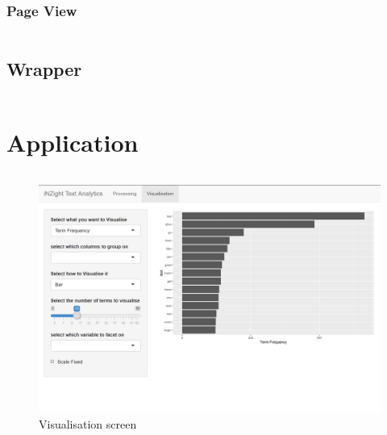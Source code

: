 \documentclass[11pt, a4paper, oneside]{report}
\begin{document}
\inputminted[frame=lines,fontsize=\scriptsize,xleftmargin=\parindent,linenos]{R}{R/time-series.R}

\subsubsection{Page View}\label{sec:page-view}

\inputminted[frame=lines,fontsize=\scriptsize,xleftmargin=\parindent,linenos]{R}{R/page-view.R}

\subsection{Wrapper}\label{sec:wrapper-1}

\inputminted[frame=lines,fontsize=\scriptsize,xleftmargin=\parindent,linenos]{R}{R/get-vis.R}

\section{Application}\label{sec:application}

\inputminted[frame=lines,fontsize=\scriptsize,xleftmargin=\parindent,linenos]{R}{R/app.R}

\begin{figure}
\centering
\includegraphics[scale=0.4]{visualisation-overview.png}
\caption{Visualisation screen\label{fig:visualisation-overview}}
\end{figure}
\end{document}
